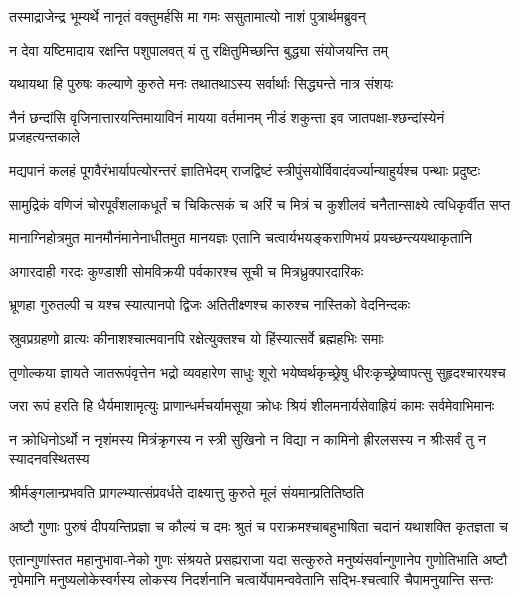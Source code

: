 \twolineshloka
{तस्माद्राजेन्द्र भूम्यर्थे नानृतं वक्तुमर्हसि}
{मा गमः ससुतामात्यो नाशं पुत्रार्थमब्रुवन्}


\twolineshloka
{न देवा यष्टिमादाय रक्षन्ति पशुपालवत्}
{यं तु रक्षितुमिच्छन्ति बुद्ध्या संयोजयन्ति तम्}


\twolineshloka
{यथायथा हि पुरुषः कल्याणे कुरुते मनः}
{तथातथाऽस्य सर्वार्थाः सिद्ध्यन्ते नात्र संशयः}


\twolineshloka
{नैनं छन्दांसि वृजिनात्तारयन्तिमायाविनं मायया वर्तमानम्}
{नीडं शकुन्ता इव जातपक्षा-श्छन्दांस्येनं प्रजहत्यन्तकाले}


\twolineshloka
{मद्यपानं कलहं पूगवैरंभार्यापत्योरन्तरं ज्ञातिभेदम्}
{राजद्विष्टं स्त्रीपुंसयोर्विवादंवर्ज्यान्याहुर्यश्च पन्थाः प्रदुष्टः}


\twolineshloka
{सामुद्रिकं वणिजं चोरपूर्वंशलाकधूर्तं च चिकित्सकं च}
{अरिं च मित्रं च कुशीलवं चनैतान्साक्ष्ये त्वधिकृर्वीत सप्त}


\twolineshloka
{मानाग्निहोत्रमुत मानमौनंमानेनाधीतमुत मानयज्ञः}
{एतानि चत्वार्यभयङ्कराणिभयं प्रयच्छन्त्ययथाकृतानि}


\twolineshloka
{अगारदाही गरदः कुण्डाशी सोमविक्रयी}
{पर्वकारश्च सूची च मित्रध्रुक्पारदारिकः}


\twolineshloka
{भ्रूणहा गुरुतल्पी च यश्च स्यात्पानपो द्विजः}
{अतितीक्ष्णश्च कारुश्च नास्तिको वेदनिन्दकः}


\twolineshloka
{स्रुवप्रग्रहणो व्रात्यः कीनाशश्चात्मवानपि}
{रक्षेत्युक्तश्च यो हिंस्यात्सर्वे ब्रह्महभिः समाः}


\twolineshloka
{तृणोल्कया ज्ञायते जातरूपंवृत्तेन भद्रो व्यवहारेण साधुः}
{शूरो भयेष्वर्थकृच्छ्रेषु धीरःकृच्छ्रेष्वापत्सु सुहृदश्चारयश्च}


\threelineshloka
{जरा रूपं हरति हि धैर्यमाशामृत्युः प्राणान्धर्मचर्यामसूया}
{क्रोधः श्रियं शीलमनार्यसेवाह्रियं कामः सर्वमेवाभिमानः}
{}


\twolineshloka
{न क्रोधिनोऽर्थो न नृशंमस्य मित्रंक्रृगस्य न स्त्री सुखिनो न विद्या}
{न कामिनो ह्रीरलसस्य न श्रीःसर्वं तु न स्यादनवस्थितस्य}


\twolineshloka
{श्रीर्मङ्गलान्प्रभवति प्रागल्भ्यात्संप्रवर्धते}
{दाक्ष्यात्तु कुरुते मूलं संयमान्प्रतितिष्ठति}


\twolineshloka
{अष्टौ गुणाः पुरुषं दीपयन्तिप्रज्ञा च कौल्यं च दमः श्रुतं च}
{पराक्रमश्चाबहुभाषिता चदानं यथाशक्ति कृतज्ञता च}


एतान्गुणांस्तत महानुभावा-नेको गुणः संश्रयते प्रसह्यराजा यदा सत्कुरुते मनुष्यंसर्वान्गुणानेप गुणोतिभाति
\twolineshloka
{अष्टौ नृपेमानि मनुष्यलोकेस्वर्गस्य लोकस्य निदर्शनानि}
{चत्वार्येपामन्ववेतानि सद्भि-श्चत्वारि चैपामनुयान्ति सन्तः}


